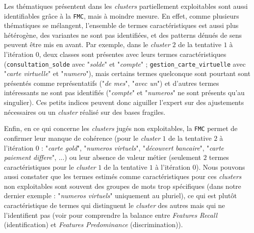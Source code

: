 			Les thématiques présentent dans les \textit{clusters} partiellement exploitables sont aussi identifiables grâce à la \texttt{FMC}, mais à moindre mesure.
			En effet, comme plusieurs thématiques se mélangent, l'ensemble de termes caractéristiques est aussi plus hétérogène, des variantes ne sont pas identifiées, et des patterns dénués de sens peuvent être mis en avant.
			Par exemple, dans le \textit{cluster} $2$ de la tentative $1$ à l'itération $0$, deux classes sont présentes avec leurs termes caractéristiques (\texttt{consultation\_solde} avec "\textit{solde}" et "\textit{compte}" ; \texttt{gestion\_carte\_virtuelle} avec "\textit{carte virtuelle}" et "\textit{numero}"), mais certains termes quelconque sont pourtant sont présentés comme représentatifs ("\textit{de mes}", "\textit{avec un}") et d'autres termes intéressants ne sont pas identifiés ("\textit{compte}" et "\textit{numeros}" ne sont présents qu'au singulier).
			Ces petits indices peuvent donc aiguiller l'expert sur des ajustements nécessaires ou un \textit{cluster} réalisé sur des bases fragiles.
			
			Enfin, en ce qui concerne les \textit{clusters} jugés non exploitables, la \texttt{FMC} permet de confirmer leur manque de cohérence (pour le \textit{cluster} $1$ de la tentative $2$ à l'itération $0$ : "\textit{carte gold}", "\textit{numeros virtuels}", "\textit{découvert bancaire}", "\textit{carte paiement differe}", ...) ou leur absence de valeur métier (seulement $2$ termes caractéristiques pour le \textit{cluster} $1$ de la tentative $1$ à l'itération $0$).
			Nous pouvons aussi constater que les termes estimés comme caractéristiques pour ces \textit{clusters} non exploitables sont souvent des groupes de mots trop spécifiques (dans notre dernier exemple : "\textit{numeros virtuels}" uniquement au pluriel), ce qui est plutôt caractéristique de termes qui distinguent le \textit{cluster} des autres mais qui ne l'identifient pas (voir \cite{lamirel-etal:2017:novel-approach-feature} pour comprendre la balance entre \textit{Features Recall} (identification) et \textit{Features Predominance} (discrimination)).
			\\
			
